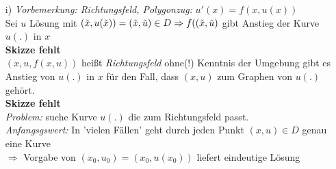 \begin{enumerate}
    \item[i)] \emph{Vorbemerkung: Richtungsfeld, Polygonzug:} $u'(x) = f(x, u(x))$\\
        Sei $u$ Lösung mit $(\tilde{x}, u(\tilde{x})) = (\tilde{x}, \tilde{u}) \in D\\
        \Rightarrow f((\tilde{x}, \tilde{u}) $ gibt Anstieg der Kurve $u(.) $ in $x$\\
        \textbf{Skizze fehlt}\\
        $(x, u, f(x,u)) $ heißt \emph{Richtungsfeld}
        ohne(!) Kenntnis der Umgebung gibt es Anstieg von $u(.)$ in $x$ 
        für den Fall, dass $(x,u) $ zum Graphen von $u(.) $ gehört.\\
        \textbf{Skizze fehlt}\\
        \emph{Problem:} suche Kurve $u(.) $ die zum Richtungsfeld passt.\\
        \emph{Anfangsgswert:} In 'vielen Fällen' geht durch jeden Punkt $(x,u) \in D $
        genau eine Kurve \\
        $\Rightarrow $ Vorgabe von $(x_0, u_0) = (x_0, u(x_0)) $ 
        liefert eindeutige Lösung
        

\end{enumerate}
